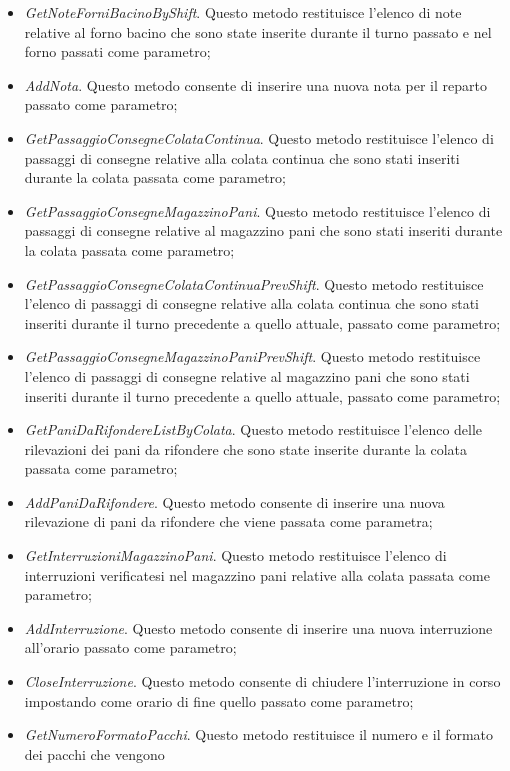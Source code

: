 \begin{itemize}
    \item \textit{GetNoteForniBacinoByShift}. Questo metodo restituisce l'elenco di note relative al forno bacino che
    sono state inserite durante il turno passato e nel forno passati come parametro;
    \item \textit{AddNota}. Questo metodo consente di inserire una nuova nota per il reparto passato come parametro;
    \item \textit{GetPassaggioConsegneColataContinua}. Questo metodo restituisce l'elenco di passaggi di consegne
    relative alla colata continua che sono stati inseriti durante la colata passata come parametro;
    \item \textit{GetPassaggioConsegneMagazzinoPani}. Questo metodo restituisce l'elenco di passaggi di consegne
    relative al magazzino pani che sono stati inseriti durante la colata passata come parametro;
    \item \textit{GetPassaggioConsegneColataContinuaPrevShift}. Questo metodo restituisce l'elenco di passaggi di
    consegne relative alla colata continua che sono stati inseriti durante il turno precedente a quello attuale,
    passato come parametro;
    \item \textit{GetPassaggioConsegneMagazzinoPaniPrevShift}. Questo metodo restituisce l'elenco di passaggi di
    consegne relative al magazzino pani che sono stati inseriti durante il turno precedente a quello attuale,
    passato come parametro;
    \item \textit{GetPaniDaRifondereListByColata}. Questo metodo restituisce l'elenco delle rilevazioni dei pani da
    rifondere che sono state inserite durante la colata passata come parametro;
    \item \textit{AddPaniDaRifondere}. Questo metodo consente di inserire una nuova rilevazione di pani da rifondere
    che viene passata come parametra;
    \item \textit{GetInterruzioniMagazzinoPani}. Questo metodo restituisce l'elenco di interruzioni verificatesi nel
    magazzino pani relative alla colata passata come parametro;
    \item \textit{AddInterruzione}. Questo metodo consente di inserire una nuova interruzione all'orario passato come
    parametro;
    \item \textit{CloseInterruzione}. Questo metodo consente di chiudere l'interruzione in corso impostando come
    orario di fine quello passato come parametro;
    \item \textit{GetNumeroFormatoPacchi}. Questo metodo restituisce il numero e il formato dei pacchi che vengono

\end{itemize}
